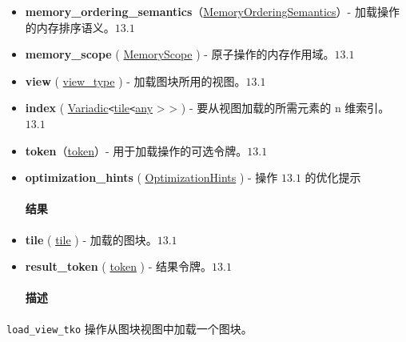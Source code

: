 \documentclass{article}
\begin{document}
\begin{itemize}
\item \textbf{memory\_ordering\_semantics}（\href{https://docs.nvidia.com/cuda/tile-ir/latest/sections/operations.html#op-attribute-cuda-tile-load-view-tko-memoryorderingsemantics-attr}{MemoryOrderingSemantics}）- 加载操作的内存排序语义。$\boxed{13.1}$
\item \textbf{memory\_scope} ( \href{https://docs.nvidia.com/cuda/tile-ir/latest/sections/operations.html#op-attribute-cuda-tile-load-view-tko-memoryscope-attr}{MemoryScope} ) - 原子操作的内存作用域。$\boxed{13.1}$
\item \textbf{view} ( \href{https://docs.nvidia.com/cuda/tile-ir/latest/sections/operations.html#type-view-type}{view\_type} ) - 加载图块所用的视图。$\boxed{13.1}$
\item \textbf{index} ( \href{https://docs.nvidia.com/cuda/tile-ir/latest/sections/operations.html#type-variadic}{Variadic}\texttt{<}\href{https://docs.nvidia.com/cuda/tile-ir/latest/sections/types.html#type-tile}{tile}\texttt{<}\href{https://docs.nvidia.com/cuda/tile-ir/latest/sections/operations.html#type-any}{any} > > ) - 要从视图加载的所需元素的 n 维索引。$\boxed{13.1}$
\item \textbf{token}（\href{https://docs.nvidia.com/cuda/tile-ir/latest/sections/operations.html#type-token}{token}）- 用于加载操作的可选令牌。$\boxed{13.1}$
\item \textbf{optimization\_hints} ( \href{https://docs.nvidia.com/cuda/tile-ir/latest/sections/operations.html#op-attribute-cuda-tile-load-view-tko-optimizationhints-attr}{OptimizationHints} ) - 操作 $\boxed{13.1}$ 的优化提示




\paragraph{结果}


\item \textbf{tile} ( \href{https://docs.nvidia.com/cuda/tile-ir/latest/sections/types.html#type-tile}{tile} ) - 加载的图块。$\boxed{13.1}$
\item \textbf{result\_token} ( \href{https://docs.nvidia.com/cuda/tile-ir/latest/sections/operations.html#type-token}{token} ) - 结果令牌。$\boxed{13.1}$




\paragraph{描述}


\end{itemize}
\texttt{load\_view\_tko} 操作从图块视图中加载一个图块。
\end{document}
